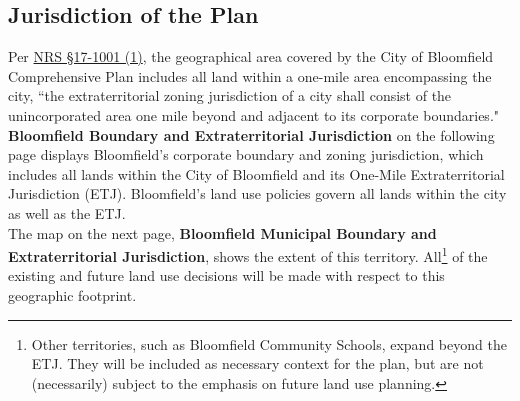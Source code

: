 \pagebreak
\subsection*{Jurisdiction of the Plan}
\noindent Per \href{https://nebraskalegislature.gov/laws/statutes.php?statute=17-1001}{NRS \S17-1001 (1)}, the geographical area covered by the City of Bloomfield Comprehensive Plan includes all land within a one-mile area encompassing the city, ``the extraterritorial zoning jurisdiction of a city shall consist of the unincorporated area one mile beyond and adjacent to its corporate boundaries."\\

\noindent \textbf{Bloomfield Boundary and Extraterritorial Jurisdiction} on the following page displays Bloomfield's corporate boundary and zoning jurisdiction, which includes all lands within the City of Bloomfield and its One-Mile Extraterritorial Jurisdiction (ETJ). Bloomfield's land use policies govern all lands within the city as well as the ETJ.\\

\noindent The map on the next page, \textbf{\textcolor{coBalt}{Bloomfield Municipal Boundary and Extraterritorial Jurisdiction}}, shows the extent of this territory. All\footnote{Other territories, such as Bloomfield Community Schools, expand beyond the ETJ. They will be included as necessary context for the plan, but are not (necessarily) subject to the emphasis on future land use planning.} of the existing and future land use decisions will be made with respect to this geographic footprint.

\pagebreak
\begin{landscape}
    
\end{landscape}
\pagebreak